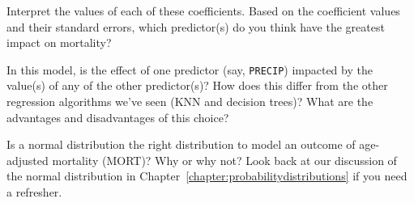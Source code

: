 \begin{question}{}
Interpret the values of each of these coefficients. Based on the coefficient values and their standard errors, which predictor(s) do you think have the greatest impact on mortality? 
\end{question}

\begin{question}{}
In this model, is the effect of one predictor (say, \verb|PRECIP|) impacted by the value(s) of any of the other predictor(s)? How does this differ from the other regression algorithms we've seen (KNN and decision trees)? What are the advantages and disadvantages of this choice? 
\end{question}

\begin{question}{}
Is a normal distribution the right distribution to model an outcome of age-adjusted mortality (MORT)? Why or why not? Look back at our discussion of the normal distribution in Chapter~\ref{chapter:probabilitydistributions} if you need a refresher. 
\end{question}
